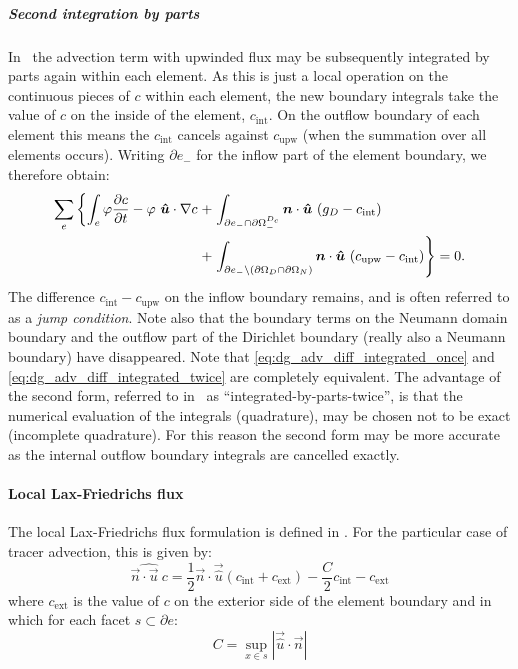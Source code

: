 \subparagraph{Second integration by parts}

In \fluidity\ the advection term with upwinded flux may be subsequently
integrated by parts again within each element. As this is just a local
operation on the continuous pieces of $c$ within each element, the new
boundary integrals take the value of $c$ on the inside of the element,
$c_{\mathrm{int}}$. On the outflow boundary of each element this means the
$c_{\mathrm{int}}$ cancels against $c_{\mathrm{upw}}$ (when the summation over all elements occurs).
Writing $\partial e_-$ for the inflow part of the element boundary, we therefore obtain:
\begin{equation}
\begin{split}
  \sum_e \left\{ \int_e \varphi \frac{\partial c}{\partial t}
  - \varphi~{\mbox{\boldmath$\hat u$}}\cdot\nabla c \right.
    +& \left. \int_{\partial e_- \cap\partial\Omega^{D_c}_-} {\mbox{\boldmath$n$}}\cdot{\mbox{\boldmath$\hat u$}}~(g_D -c_{\mathrm{int}}) \right. \\
    +& \left. \int_{\partial e_-\setminus (\partial\Omega_D\cap\partial\Omega_N)}
    {\mbox{\boldmath$n$}}\cdot{\mbox{\boldmath$\hat u$}}~
      (c_{\mathrm{upw}}-c_{\mathrm{int}}) \right\} =0.
    \label{eq:dg_adv_diff_integrated_twice}
\end{split}
\end{equation}
The difference $c_{\mathrm{int}}-c_{\mathrm{upw}}$ on the inflow boundary
remains, and is often referred to as a \emph{jump condition}. Note also that
the boundary terms on the Neumann domain boundary and the outflow part of
the Dirichlet boundary (really also a Neumann boundary) have disappeared.
Note that \eqref{eq:dg_adv_diff_integrated_once} and
\eqref{eq:dg_adv_diff_integrated_twice} are completely equivalent. The
advantage of the second form, referred to in \fluidity\ as
``integrated-by-parts-twice'', is that the numerical evaluation of the
integrals (quadrature), may be chosen not to be exact (incomplete quadrature). For this
reason the second form may be more accurate as the internal outflow boundary
integrals are cancelled exactly.

\paragraph{Local Lax-Friedrichs flux}

The local Lax-Friedrichs flux formulation is defined in
\citet[p208]{cockburn2001}. For the
particular case of tracer advection, this is given by:
\begin{equation}
  \widehat{\vec{n}\cdot\vec{u}~c}=\frac{1}{2}\vec{n}\cdot\vec{\hat u}
  \left(c_{\mathrm{int}}+c_{\mathrm{ext}}\right)
  -\frac{C}{2}c_{\mathrm{int}}-c_{\mathrm{ext}}
\end{equation}
where $c_{\mathrm{ext}}$ is the value of $c$ on the exterior side of the
  element boundary and in which for each facet $s\subset\partial e$:
\begin{equation}
  C= \sup_{x\in s}|\vec{\hat u}\cdot\vec{n}|
\end{equation}

